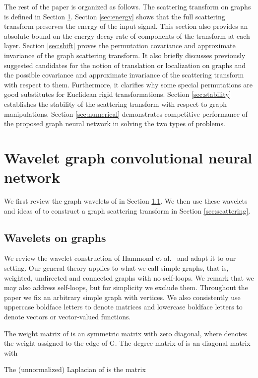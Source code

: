 \documentclass{article}
\begin{document}
The rest of the paper is organized as follows. The scattering transform on graphs is defined in Section \ref{sec:wgcn}. Section \ref{sec:energy} shows that the full scattering transform preserves the energy of the input signal. This section also provides an absolute bound on the energy decay rate of components of the transform at each layer. Section \ref{sec:shift} proves the permutation covariance and approximate invariance of the {graph} scattering transform. It also briefly discusses {previously suggested candidates for the notion of translation or localization on graphs and} the possible covariance and approximate invariance of the scattering transform with respect to them. {Furthermore,
it clarifies why some special permutations are good substitutes for Euclidean rigid transformations.} Section \ref{sec:stability} establishes the stability of the scattering transform with respect to graph manipulations. Section \ref{sec:numerical} demonstrates competitive performance of the proposed graph neural network in solving the two types of problems. 

\section{Wavelet graph convolutional neural network}\label{sec:wgcn}
We first review the graph wavelets of \cite{HamVG11} in Section \ref{sec:wavelet}. We then use these wavelets and ideas of \cite{Mal13} to construct a graph scattering transform in Section \ref{sec:scattering}.  

\subsection{Wavelets on graphs}\label{sec:wavelet}
We review the wavelet construction of Hammond et al.~\cite{HamVG11} and adapt it to our setting. Our general theory applies to what we call simple graphs, that is, weighted, undirected and connected graphs with no self-loops. We remark that we may also address self-loops, but for simplicity we exclude them. Throughout the paper we fix an arbitrary simple graph  with  vertices. We also consistently use uppercase boldface letters to denote matrices and lowercase boldface letters to denote vectors or vector-valued functions. 

The weight matrix of  is an  symmetric matrix  with zero diagonal, where  denotes the weight assigned to the edge  of G.
The degree matrix of  is an  diagonal matrix with

The (unnormalized) Laplacian of  is the  matrix 
\end{document}
